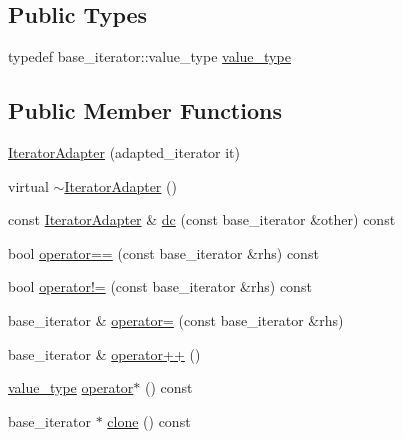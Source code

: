 \subsection*{Public Types}
\begin{DoxyCompactItemize}
\item 
typedef base\+\_\+iterator\+::value\+\_\+type \hyperlink{class_wire_cell_1_1_iterator_adapter_a8f7594d66b0d00566f61976bcf4ab13e}{value\+\_\+type}
\end{DoxyCompactItemize}
\subsection*{Public Member Functions}
\begin{DoxyCompactItemize}
\item 
\hyperlink{class_wire_cell_1_1_iterator_adapter_af12e12abf4b3fb3745d53283313da519}{Iterator\+Adapter} (adapted\+\_\+iterator it)
\item 
virtual \hyperlink{class_wire_cell_1_1_iterator_adapter_adeab5caf488dab6b0cdb1dc48ccccb53}{$\sim$\+Iterator\+Adapter} ()
\item 
const \hyperlink{class_wire_cell_1_1_iterator_adapter}{Iterator\+Adapter} \& \hyperlink{class_wire_cell_1_1_iterator_adapter_a1a14d011a73fdf78031443584d3e86e0}{dc} (const base\+\_\+iterator \&other) const
\item 
bool \hyperlink{class_wire_cell_1_1_iterator_adapter_a3f4f894ddaeed9584b3994089e77383b}{operator==} (const base\+\_\+iterator \&rhs) const
\item 
bool \hyperlink{class_wire_cell_1_1_iterator_adapter_a8c609990561562aeae2069a949db4932}{operator!=} (const base\+\_\+iterator \&rhs) const
\item 
base\+\_\+iterator \& \hyperlink{class_wire_cell_1_1_iterator_adapter_a66731e2bbad5dcdcb37d78cb10865bea}{operator=} (const base\+\_\+iterator \&rhs)
\item 
base\+\_\+iterator \& \hyperlink{class_wire_cell_1_1_iterator_adapter_a6c8b893a3c7f600fcb2cc567f4ceb8e6}{operator++} ()
\item 
\hyperlink{class_wire_cell_1_1_iterator_adapter_a8f7594d66b0d00566f61976bcf4ab13e}{value\+\_\+type} \hyperlink{class_wire_cell_1_1_iterator_adapter_a50675ee1e3bbf5f351414fbede73520f}{operator$\ast$} () const
\item 
base\+\_\+iterator $\ast$ \hyperlink{class_wire_cell_1_1_iterator_adapter_a8716b6af5943b38471e58faaea8cc2c3}{clone} () const
\end{DoxyCompactItemize}


